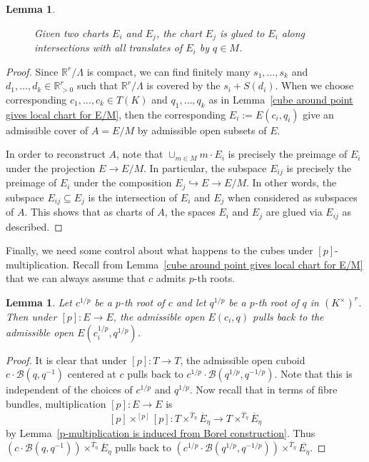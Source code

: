 \documentclass[10pt,oneside]{amsart}
\newtheorem{lemma}[theorem]{Lemma}
\theoremstyle{definition}
\begin{document}
\begin{lemma}
\begin{figure}
		
		\caption{Given two charts $E_i$ and $E_j$, the chart $E_j$ is glued to $E_i$ along intersections with all translates of $E_i$ by $q\in M$.}
		\label{glue-cover-tikzpicture}
	\end{figure}
	
	\end{lemma} 
	\begin{proof}
	Since $\mathbb R^r/\Lambda$ is compact, we can find finitely many $s_1,\dots,s_k$ and $d_1,\dots,d_k \in \mathbb{R}^r_{>0}$ such that $\mathbb R^r/\Lambda$ is covered by the $s_i+S(d_i)$. When we choose corresponding $c_1,\dots,c_k \in T(K)$ and $q_1,\dots,q_k$ as in Lemma~\ref{cube around point gives local chart for E/M}, then the corresponding $E_i:=E(c_i,q_i)$ give an admissible cover of $A=E/M$ by admissible open subsets of $E$.
	
	In order to reconstruct $A$, note that $\cup_{m\in M} m\cdot E_i$ is precisely the preimage of $E_i$ under the projection $E\rightarrow E/M$. In particular, the subspace $E_{ij}$ is precisely the preimage of $E_i$ under the composition $E_j\hookrightarrow E \rightarrow E/M$. In other words, the subspace $E_{ij}\subseteq E_j$ is the intersection of $E_i$ and $E_j$ when considered as subspaces of $A$. This shows that as charts of $A$, the spaces $E_i$ and $E_j$ are glued via $E_{ij}$ as described.
	\end{proof}
	Finally, we need some control about what happens to the cubes under $[p]$-multiplication. Recall from Lemma~\ref{cube around point gives local chart for E/M} that we can always assume that $c$ admits $p$-th roots.
	\begin{lemma}\label{pullback of cuboid is cuboid}
		Let $c^{1/p}$ be a $p$-th root of $c$ and let $q^{1/p}$ be a $p$-th root of $q$ in $(K^\times)^r$. Then under $[p]:E\rightarrow E$, the admissible open $E(c_i,q)$ pulls back to the admissible open $E(c_i^{1/p},q^{1/p})$.
	\end{lemma}
	\begin{proof}
		It is clear that under $[p]:T\rightarrow T$, the admissible open cuboid $c\cdot \mathcal B(q,q^{-1})$ centered at $c$ pulls back to $c^{1/p}\cdot \mathcal B(q^{1/p},q^{-1/p})$. Note that this is independent of the choices of $c^{1/p}$ and $q^{1/p}$. Now recall that in terms of fibre bundles, multiplication $[p]:E\rightarrow E$ is
		\[[p]\times^{[p]}[p]: T\times^{\overline{T}_\eta}\overline{E}_\eta\rightarrow T\times^{\overline{T}_\eta}\overline{E}_\eta \]
		by Lemma~\ref{p-multiplication is induced from Borel construction}. Thus $(c\cdot \mathcal B(q,q^{-1}))\times^{\overline{T}_\eta}\overline{E}_\eta$ pulls back to $(c^{1/p}\cdot \mathcal B(q^{1/p},q^{-1/p}))\times^{\overline{T}_\eta}\overline{E_\eta}$.
	\end{proof}
\end{document}
